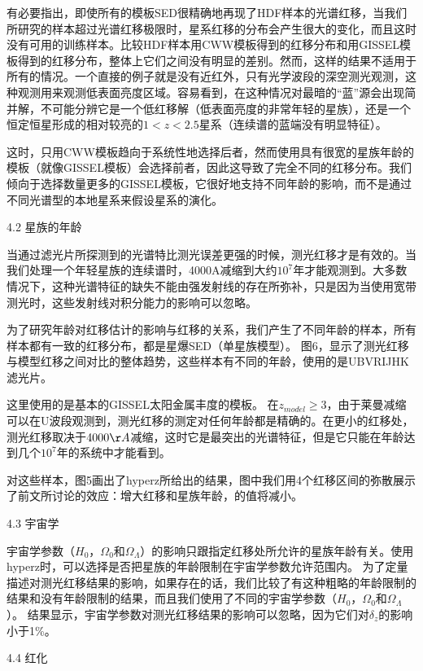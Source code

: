 有必要指出，即使所有的模板SED很精确地再现了HDF样本的光谱红移，当我们所研究的样本超过光谱红移极限时，星系红移的分布会产生很大的变化，而且这时没有可用的训练样本。比较HDF样本用CWW模板得到的红移分布和用GISSEL模板得到的红移分布，整体上它们之间没有明显的差别。然而，这样的结果不适用于所有的情况。一个直接的例子就是没有近红外，只有光学波段的深空测光观测，这种观测用来观测低表面亮度区域。容易看到，在这种情况对最暗的“蓝”源会出现简并解，不可能分辨它是一个低红移解（低表面亮度的非常年轻的星族），还是一个恒定恒星形成的相对较亮的$1<z< 2.5$星系（连续谱的蓝端没有明显特征）。
 
这时，只用CWW模板趋向于系统性地选择后者，然而使用具有很宽的星族年龄的模板（就像GISSEL模板）会选择前者，因此这导致了完全不同的红移分布。我们倾向于选择数量更多的GISSEL模板，它很好地支持不同年龄的影响，而不是通过不同光谱型的本地星系来假设星系的演化。
 
4.2 星族的年龄
 
当通过滤光片所探测到的光谱特比测光误差更强的时候，测光红移才是有效的。当我们处理一个年轻星族的连续谱时，4000A减缩到大约$10^7$年才能观测到。大多数情况下，这种光谱特征的缺失不能由强发射线的存在所弥补，只是因为当使用宽带测光时，这些发射线对积分能力的影响可以忽略。
 
为了研究年龄对红移估计的影响与红移的关系，我们产生了不同年龄的样本，所有样本都有一致的红移分布，都是星爆SED（单星族模型）。
图6，显示了测光红移与模型红移之间对比的整体趋势，这些样本有不同的年龄，使用的是UBVRIJHK滤光片。
 
 
这里使用的是基本的GISSEL太阳金属丰度的模板。
在$z_{model}\geq3$，由于莱曼减缩可以在U波段观测到，测光红移的测定对任何年龄都是精确的。在更小的红移处，测光红移取决于$4000\AA$减缩，这时它是最突出的光谱特征，但是它只能在年龄达到几个$10^7$年的系统中才能看到。
 
对这些样本，图5画出了hyperz所给出的结果，图中我们用4个红移区间的弥散展示了前文所讨论的效应：增大红移和星族年龄，的值将减小。
 
4.3 宇宙学
 
宇宙学参数（$H_0$，$\Omega_0$和$\Omega_\Lambda$）的影响只跟指定红移处所允许的星族年龄有关。使用hyperz时，可以选择是否把星族的年龄限制在宇宙学参数允许范围内。
为了定量描述对测光红移结果的影响，如果存在的话，我们比较了有这种粗略的年龄限制的结果和没有年龄限制的结果，而且我们使用了不同的宇宙学参数（$H_0$，$\Omega_0$和$\Omega_\Lambda$）。
结果显示，宇宙学参数对测光红移结果的影响可以忽略，因为它们对$\delta_z$的影响小于1\%。
 
 
 
 
 
4.4 红化
 
